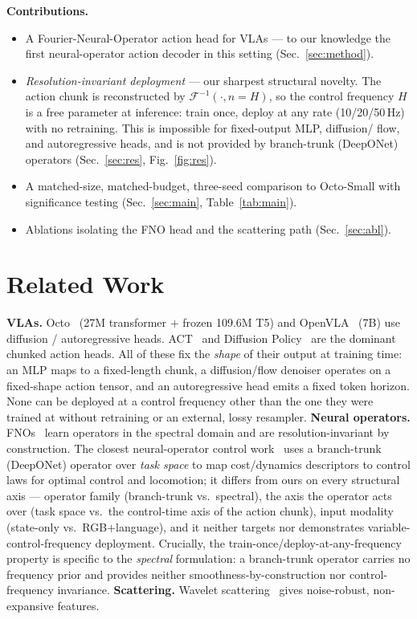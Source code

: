 \documentclass[conference]{IEEEtran}
\begin{document}
\noindent\textbf{Contributions.}
\begin{itemize}
\item A Fourier-Neural-Operator action head for VLAs --- to our knowledge the first
neural-operator action decoder in this setting (Sec.~\ref{sec:method}).
\item \emph{Resolution-invariant deployment} --- our sharpest structural novelty. The
action chunk is reconstructed by $\mathcal{F}^{-1}(\cdot,n{=}H)$, so the control
frequency $H$ is a free parameter at inference: train once, deploy at any rate
(10/20/50\,Hz) with no retraining. This is impossible for fixed-output MLP, diffusion/
flow, and autoregressive heads, and is not provided by branch-trunk (DeepONet)
operators (Sec.~\ref{sec:res}, Fig.~\ref{fig:res}).
\item A matched-size, matched-budget, three-seed comparison to Octo-Small with
significance testing (Sec.~\ref{sec:main}, Table~\ref{tab:main}).
\item Ablations isolating the FNO head and the scattering path (Sec.~\ref{sec:abl}).
\end{itemize}

\section{Related Work}
\textbf{VLAs.} Octo~\cite{octo} (27M transformer $+$ frozen 109.6M T5) and
OpenVLA~\cite{openvla} (7B) use diffusion / autoregressive heads. ACT~\cite{act} and
Diffusion Policy~\cite{dp} are the dominant chunked action heads. All of these fix the
\emph{shape} of their output at training time: an MLP maps to a fixed-length chunk, a
diffusion/flow denoiser operates on a fixed-shape action tensor, and an autoregressive
head emits a fixed token horizon. None can be deployed at a control frequency other
than the one they were trained at without retraining or an external, lossy resampler.
\textbf{Neural operators.} FNOs~\cite{fno} learn operators in the spectral domain and
are resolution-invariant by construction. The closest neural-operator control
work~\cite{sewell} uses a branch-trunk (DeepONet) operator over \emph{task space} to
map cost/dynamics descriptors to control laws for optimal control and locomotion; it
differs from ours on every structural axis --- operator family (branch-trunk vs.\
spectral), the axis the operator acts over (task space vs.\ the control-time axis of
the action chunk), input modality (state-only vs.\ RGB$+$language), and it neither
targets nor demonstrates variable-control-frequency deployment. Crucially, the
train-once/deploy-at-any-frequency property is specific to the \emph{spectral}
formulation: a branch-trunk operator carries no frequency prior and provides neither
smoothness-by-construction nor control-frequency invariance. \textbf{Scattering.}
Wavelet scattering~\cite{scattering} gives noise-robust, non-expansive features.
\end{document}
